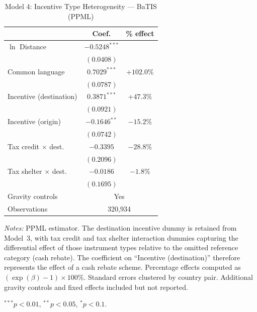 \clearpage


\begin{table}[htbp]
\centering
\caption{Model 4: Incentive Type Heterogeneity --- BaTIS (PPML)}
\label{tab:batis_model4}
\small
\begin{tabular}{l cc}
\toprule
 & Coef. & \% effect \\
\midrule
$\ln$ Distance & $-0.5248^{***}$ & \\
 & $(0.0408)$ & \\[4pt]
Common language & $0.7029^{***}$ & $+102.0\%$ \\
 & $(0.0787)$ & \\[4pt]
Incentive (destination) & $0.3871^{***}$ & $+47.3\%$ \\
 & $(0.0921)$ & \\[4pt]
Incentive (origin) & $-0.1646^{**}$ & $-15.2\%$ \\
 & $(0.0742)$ & \\[4pt]
Tax credit $\times$ dest. & $-0.3395$ & $-28.8\%$ \\
 & $(0.2096)$ & \\[4pt]
Tax shelter $\times$ dest. & $-0.0186$ & $-1.8\%$ \\
 & $(0.1695)$ & \\[4pt]
\midrule
Gravity controls & \multicolumn{2}{c}{Yes} \\
Observations & \multicolumn{2}{c}{320,934} \\
\bottomrule
\end{tabular}
\par\vspace{4pt}\noindent\begin{minipage}{\textwidth}
\footnotesize
\par \textit{Notes:} PPML estimator. The destination incentive dummy is retained from Model~3, with tax credit and tax shelter interaction dummies capturing the differential effect of those instrument types relative to the omitted reference category (cash rebate). The coefficient on ``Incentive (destination)'' therefore represents the effect of a cash rebate scheme. Percentage effects computed as $(\exp(\beta)-1) \times 100\%$. Standard errors clustered by country pair. Additional gravity controls and fixed effects included but not reported.
\par $^{***}p<0.01$, $^{**}p<0.05$, $^{*}p<0.1$.
\end{minipage}
\end{table}

